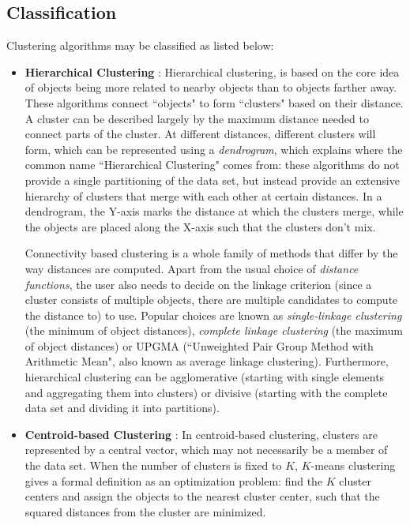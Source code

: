 \subsection{Classification}
Clustering algorithms may be classified as listed below:
\begin{itemize}
\item \textbf{Hierarchical Clustering} : Hierarchical clustering, is based on the core idea of objects being more
related to nearby objects than to objects farther away. These algorithms connect ``objects" to form ``clusters"
based on their distance. A cluster can be described largely by the maximum distance needed to connect parts of
the cluster. At different distances, different clusters will form, which can be represented using a \textit{dendrogram},
which explains where the common name ``Hierarchical Clustering" comes from: these algorithms do not provide a
single partitioning of the data set, but instead provide an extensive hierarchy of clusters that merge with each
other at certain distances. In a dendrogram, the Y-axis marks the distance at which the clusters merge, while the
objects are placed along the X-axis such that the clusters don't mix.

Connectivity based clustering is a whole family of methods that differ by the way distances are computed.
Apart from the usual choice of \textit{distance functions}, the user also needs to decide on the linkage criterion
(since a cluster consists of multiple objects, there are multiple candidates to compute the distance to) to use.
Popular choices are known as \textit{single-linkage clustering} (the minimum of object distances),
\textit{complete linkage clustering} (the maximum of object distances) or UPGMA (``Unweighted Pair Group Method with
Arithmetic Mean", also known as average linkage clustering). Furthermore, hierarchical clustering can be
agglomerative (starting with single elements and aggregating them into clusters) or divisive
(starting with the complete data set and dividing it into partitions).

\item \textbf{Centroid-based Clustering} : In centroid-based clustering, clusters are represented by a central vector,
which may not necessarily be a member of the data set. When the number of clusters is fixed to $K$, $K$-means clustering
gives a formal definition as an optimization problem: find the $K$ cluster centers and assign the objects to the nearest
cluster center, such that the squared distances from the cluster are minimized.


\end{itemize}
